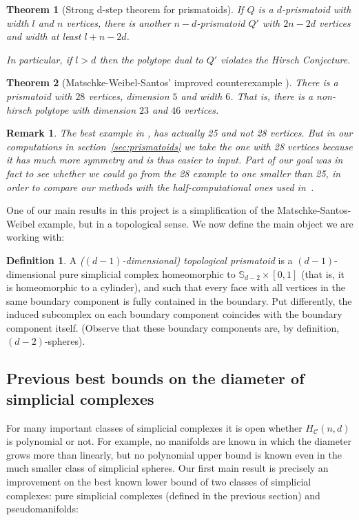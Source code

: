 \documentclass[12pt,a4paper]{article}
\theoremstyle{plain}
\newtheorem{theorem}{Theorem}
\newtheorem*{remark}{Remark}
\theoremstyle{definition}
\newtheorem{definition}{Definition}
\begin{document}
\begin{theorem}[Strong d-step theorem for prismatoids\cite{counterexample}]
  If $Q$ is a $d$-prismatoid with width $l$ and $n$ vertices, there is another $n-d$-prismatoid $Q'$ with $2n-2d$ vertices and width at least $l+n-2d$.

  In particular, if $l>d$ then the polytope dual to $Q'$ violates the Hirsch Conjecture.
\end{theorem}

\begin{theorem}[Matschke-Weibel-Santos' improved counterexample \cite{improvement}]
There is a prismatoid with $28$ vertices, dimension $5$ and width $6$. That is, there is a non-hirsch polytope with dimension $23$ and $46$ vertices.
\end{theorem}

\begin{remark}
The best example in \cite{improvement} , has actually 25 and not 28 vertices. But in our computations in section~\ref{sec:prismatoids} we take the one with 28 vertices because it has much more symmetry and is thus easier to input. Part of our goal was in fact to see whether we could go from the 28 example to one smaller than 25, in order to compare our methods with the half-computational ones used in~\cite{improvement}.
\end{remark}

One of our main results in this project is a simplification of the Matschke-Santos-Weibel example, but in a topological sense. We now define the main object we are working with:

\begin{definition}
  A \emph{($(d-1)$-dimensional) topological prismatoid} is a $(d-1)$-dimensional pure simplicial complex homeomorphic to $\mathbb{S}_{d-2}\times [0,1]$ (that is, it is homeomorphic to a cylinder), and such that every face with all vertices in the same boundary component is fully contained in the boundary. Put differently, the induced subcomplex on each boundary component coincides with the boundary component itself.
(Observe that these boundary components are, by definition, $(d-2)$-spheres).
\end{definition}

\subsection{Previous best bounds on the diameter of simplicial complexes}
For many important classes of simplicial complexes it is open whether $H_\mathcal{C}(n,d)$ is polynomial or not. For example, no manifolds are known in which the diameter grows more than linearly, but no polynomial upper bound is known even in the much smaller class of simplicial spheres.
Our first main result is precisely an improvement on the best known lower bound of two classes of simplicial complexes: pure simplicial complexes (defined in the previous section) and pseudomanifolds:
\end{document}
